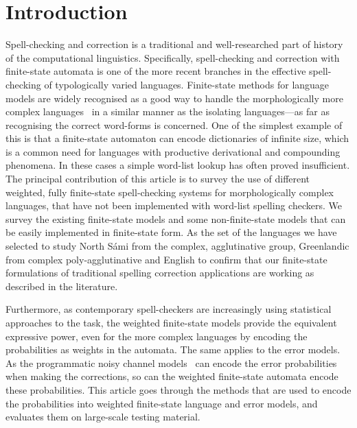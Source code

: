 \documentclass[a4paper,12pt]{article}
\begin{document}
\makeatletter\let\chapter\@undefined\makeatother
\listoftodos

\section{Introduction} 

Spell-checking and correction is a traditional and well-researched part of
history of the computational linguistics. Specifically, spell-checking and
correction with finite-state automata is one of the more recent branches in the
effective spell-checking of typologically varied languages. Finite-state
methods for language models are widely recognised as a good way to handle the
morphologically more complex languages~\cite[]{beesley2003finite} in a similar
manner as the isolating languages---as far as recognising the correct
word-forms is concerned. One of the simplest example of this is that a
finite-state automaton can encode dictionaries of infinite size, which is a
common need for languages with productive derivational and compounding
phenomena.  In these cases a simple word-list lookup has often proved
insufficient. The principal contribution of this article is to survey the use
of different weighted, fully finite-state spell-checking systems for
morphologically complex languages, that have not been implemented with
word-list spelling checkers.  We survey the existing finite-state models and
some non-finite-state models that can be easily implemented in finite-state
form.  As the set of the languages we have selected to study North Sámi from
the complex, agglutinative group, Greenlandic from complex poly-agglutinative
and English to confirm that our finite-state formulations of traditional
spelling correction applications are working as described in the literature.

Furthermore, as contemporary spell-checkers are increasingly using statistical
approaches to the task, the weighted finite-state models provide the equivalent
expressive power, even for the more complex languages by encoding the
probabilities as weights in the automata.  The same applies to the error
models. As the programmatic noisy channel models~\cite[]{brill2000improved} can
encode the error probabilities when making the corrections, so can the weighted
finite-state automata encode these probabilities. This article goes through the
methods that are used to encode the probabilities into weighted finite-state
language and error models, and evaluates them on large-scale testing material.
\end{document}
